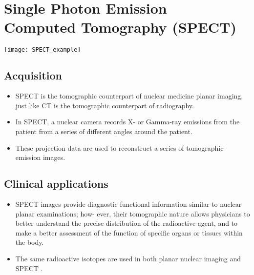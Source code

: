 \chapter{Single Photon Emission\\Computed Tomography (SPECT)}
\vspace{-45ex}
\begin{flushright}
\texttt{[image: SPECT\_example]} %
\end{flushright}

\section{Acquisition}
\begin{itemize}
\item \gls{SPECT} is the tomographic counterpart of nuclear medicine
  planar imaging, just like CT is the tomographic counterpart of
  radiography.
  
\item In SPECT, a nuclear camera records X- or Gamma-ray emissions
  from the patient from a series of different angles around the
  patient.
  
\item  These projection data are used to reconstruct a series of
  tomographic emission images.
\end{itemize}

\section{Clinical applications}
\begin{itemize}
\item SPECT images provide diagnostic functional information similar
  to nuclear planar examinations; how- ever, their tomographic nature
  allows physicians to better understand the precise distribution of
  the radioactive agent, and to make a better assessment of the
  function of specific organs or tissues within the body.
\item The same radioactive isotopes are used in both planar nuclear
  imaging and SPECT \cite{bushberg2011essential}.
\end{itemize}
